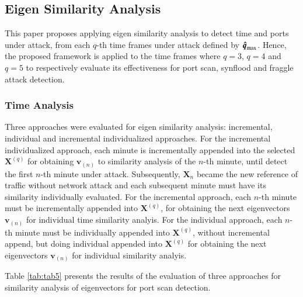 \documentclass[review]{elsarticle}
\begin{document}
\subsection{Eigen Similarity Analysis}
\label{sec:EigenSimilarityAnalysis}

This paper proposes applying eigen similarity analysis to detect time and ports under attack, from each $q$-th time frames under attack defined by $\rm{\boldsymbol{\hat{q}}}_{\rm max}$. Hence, the proposed framework is applied to the time frames where $q=3$, $q=4$ and $q=5$ to respectively evaluate its effectiveness for port scan, synflood and fraggle attack detection.

\subsubsection{Time Analysis}
\label{sec:TimeAnalysis}

Three approaches were evaluated for eigen similarity analysis: incremental, individual and incremental individualized approaches. For the incremental individualized approach, each minute is incrementally appended into the selected $\boldsymbol{X}^{(q)}$ for obtaining $\boldsymbol{v}_{(n)}$ to similarity analysis of the $n$-th minute, until detect the first $n$-th minute under attack. Subsequently, $\boldsymbol{X}_n$ became the new reference of traffic without network attack and each subsequent minute must have its similarity individually evaluated. For the incremental approach, each $n$-th minute must be incrementally appended into $\boldsymbol{X}^{(q)}$, for obtaining the next eigenvectors $\boldsymbol{v}_{(n)}$ for individual time similarity analyis. For the individual approach, each $n$-th minute must be individually appended into $\boldsymbol{X}^{(q)}$, without incremental append, but doing individual appended into $\boldsymbol{X}^{(q)}$ for obtaining the next eigenvectors $\boldsymbol{v}_{(n)}$ for individual similarity analyis.

Table \ref{tab:tab5} presents the results of the evaluation of three approaches for similarity analysis of eigenvectors for port scan detection.
\end{document}

